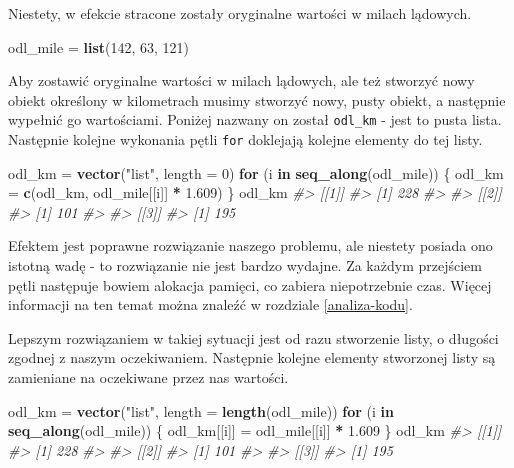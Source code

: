 \documentclass[paper=6in:9in,pagesize=pdftex,headinclude=on,footinclude=on,10pt]{scrbook}
\newenvironment{Shaded}{\begin{snugshade}}{\end{snugshade}}
\newcommand{\CommentTok}[1]{\textcolor[rgb]{0.56,0.35,0.01}{\textit{#1}}}
\newcommand{\ControlFlowTok}[1]{\textcolor[rgb]{0.13,0.29,0.53}{\textbf{#1}}}
\newcommand{\DataTypeTok}[1]{\textcolor[rgb]{0.13,0.29,0.53}{#1}}
\newcommand{\DecValTok}[1]{\textcolor[rgb]{0.00,0.00,0.81}{#1}}
\newcommand{\FloatTok}[1]{\textcolor[rgb]{0.00,0.00,0.81}{#1}}
\newcommand{\KeywordTok}[1]{\textcolor[rgb]{0.13,0.29,0.53}{\textbf{#1}}}
\newcommand{\NormalTok}[1]{#1}
\newcommand{\OperatorTok}[1]{\textcolor[rgb]{0.81,0.36,0.00}{\textbf{#1}}}
\newcommand{\StringTok}[1]{\textcolor[rgb]{0.31,0.60,0.02}{#1}}
\begin{document}
Niestety, w efekcie stracone zostały oryginalne wartości w milach lądowych.

\begin{Shaded}
\begin{Highlighting}[]
\NormalTok{odl_mile =}\StringTok{ }\KeywordTok{list}\NormalTok{(}\DecValTok{142}\NormalTok{, }\DecValTok{63}\NormalTok{, }\DecValTok{121}\NormalTok{)}
\end{Highlighting}
\end{Shaded}

Aby zostawić oryginalne wartości w milach lądowych, ale też stworzyć nowy obiekt określony w kilometrach musimy stworzyć nowy, pusty obiekt, a następnie wypełnić go wartościami.
Poniżej nazwany on został \texttt{odl\_km} - jest to pusta lista.
Następnie kolejne wykonania pętli \texttt{for} doklejają kolejne elementy do tej listy.

\begin{Shaded}
\begin{Highlighting}[]
\NormalTok{odl_km =}\StringTok{ }\KeywordTok{vector}\NormalTok{(}\StringTok{"list"}\NormalTok{, }\DataTypeTok{length =} \DecValTok{0}\NormalTok{)}
\ControlFlowTok{for}\NormalTok{ (i }\ControlFlowTok{in} \KeywordTok{seq_along}\NormalTok{(odl_mile)) \{}
\NormalTok{  odl_km =}\StringTok{ }\KeywordTok{c}\NormalTok{(odl_km, odl_mile[[i]] }\OperatorTok{*}\StringTok{ }\FloatTok{1.609}\NormalTok{)}
\NormalTok{\}}
\NormalTok{odl_km}
\CommentTok{#> [[1]]}
\CommentTok{#> [1] 228}
\CommentTok{#> }
\CommentTok{#> [[2]]}
\CommentTok{#> [1] 101}
\CommentTok{#> }
\CommentTok{#> [[3]]}
\CommentTok{#> [1] 195}
\end{Highlighting}
\end{Shaded}

Efektem jest poprawne rozwiązanie naszego problemu, ale niestety posiada ono istotną wadę - to rozwiązanie nie jest bardzo wydajne.
Za każdym przejściem pętli następuje bowiem alokacja pamięci, co zabiera niepotrzebnie czas.
Więcej informacji na ten temat można znaleźć w rozdziale \ref{analiza-kodu}.

Lepszym rozwiązaniem w takiej sytuacji jest od razu stworzenie listy, o długości zgodnej z naszym oczekiwaniem.
Następnie kolejne elementy stworzonej listy są zamieniane na oczekiwane przez nas wartości.

\begin{Shaded}
\begin{Highlighting}[]
\NormalTok{odl_km =}\StringTok{ }\KeywordTok{vector}\NormalTok{(}\StringTok{"list"}\NormalTok{, }\DataTypeTok{length =} \KeywordTok{length}\NormalTok{(odl_mile))}
\ControlFlowTok{for}\NormalTok{ (i }\ControlFlowTok{in} \KeywordTok{seq_along}\NormalTok{(odl_mile)) \{}
\NormalTok{  odl_km[[i]] =}\StringTok{ }\NormalTok{odl_mile[[i]] }\OperatorTok{*}\StringTok{ }\FloatTok{1.609}
\NormalTok{\}}
\NormalTok{odl_km}
\CommentTok{#> [[1]]}
\CommentTok{#> [1] 228}
\CommentTok{#> }
\CommentTok{#> [[2]]}
\CommentTok{#> [1] 101}
\CommentTok{#> }
\CommentTok{#> [[3]]}
\CommentTok{#> [1] 195}
\end{Highlighting}
\end{Shaded}
\end{document}

